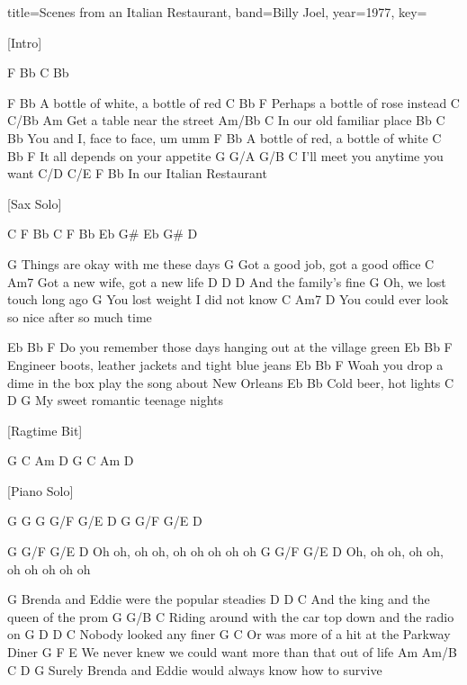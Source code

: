 \documentclass{skrul-leadsheet}
\begin{document}
\begin{song}[transpose-capo=true]{title={Scenes from an Italian Restaurant}, band={Billy Joel}, year={1977}, key={}}

[Intro]
 
F  Bb  C  Bb
 
 
F                  Bb
A bottle of white, a bottle of red
C                     Bb        F
Perhaps a bottle of rose instead
C           C/Bb     Am
Get a table near the street
             Am/Bb  C
In our old familiar place
           Bb      C     Bb
You and I, face to face, um umm
F                Bb
A bottle of red, a bottle of white
C                      Bb  F
It all depends on your appetite
G             G/A     G/B C
I'll meet you anytime you want
        C/D C/E  F       Bb
In our Italian Restaurant
 
 
[Sax Solo]
 
           C  F  Bb  C  F  Bb
           Eb  G#  Eb  G#  D
 
 
G
Things are okay with me these days
G
Got a good job, got a good office
C               Am7
Got a new wife, got a new life
        D             D D
And the family's fine
    G
Oh, we lost touch long ago
G
You lost weight I did not know
C              Am7                D
You could ever look so nice after so much time
 
 
         Eb                        Bb                 F
Do you remember those days hanging out at the village green
Eb                      Bb                     F
Engineer boots, leather jackets and tight blue jeans
                Eb                       Bb               F
Woah you drop a dime in the box play the song about New Orleans
Eb         Bb
Cold beer, hot lights
C          D              G
My sweet romantic teenage nights
 
 
[Ragtime Bit]
 
              G    C  Am  D
              G    C  Am  D
 
 
[Piano Solo]
 
             G  G
             G  G/F  G/E  D
             G  G/F  G/E  D
 
 
G  G/F    G/E    D
Oh oh, oh oh, oh oh oh oh oh
G      G/F    G/E    D
Oh, oh oh, oh oh, oh oh oh oh oh
 
 
G
Brenda and Eddie were the popular steadies
        D                             D C
And the king and the queen of the prom
G                      G/B                  C
Riding around with the car top down and the radio on
G                 D    D C
Nobody looked any finer
       G                    C
Or was more of a hit at the Parkway Diner
G                      F                          E
We never knew we could want more than that out of life
       Am         Am/B        C           D         G
Surely Brenda and Eddie would always know how to survive
 

\end{song}
\end{document}
